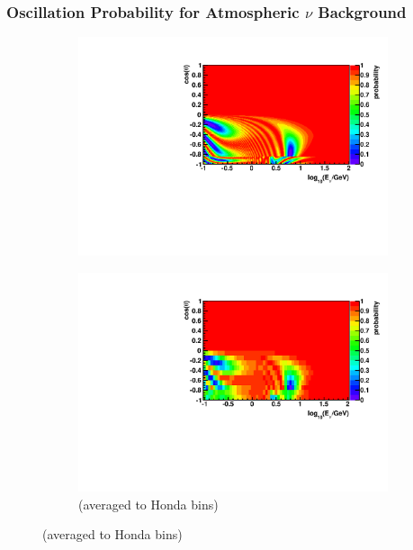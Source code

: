 \documentclass{beamer}
\begin{document}
\begin{frame}
	\frametitle{Oscillation Probability for Atmospheric $\nu$ Background}
	\begin{figure}
		\begin{subfigure}[]{0.45\linewidth}
			\centering
			\vspace{-15pt}
			\caption{ $\nu_{e} \rightarrow \nu_{e}$ }
			\vspace{-8pt}
			\includegraphics[width=\linewidth]{atm_nue2nue.pdf} \\
			\vspace{-10pt}
			\caption*{(averaged to Honda bins)}
			\vspace{-8pt}
			\includegraphics[width=\linewidth]{atm_nue2nue_avg.pdf}
			\vspace{-13pt}
		\end{subfigure}

\end{figure}
\end{frame}
\end{document}
